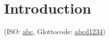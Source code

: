 \documentclass[output=paper]{langscibook}
\begin{document}
\maketitle

\section{Introduction}

(ISO: \href{https://iso639-3.sil.org/code/abc}{abc}, Glottocode: \href{https://glottolog.org/resource/languoid/id/abcd1234}{abcd1234})
 

\ea\label{ex:key:} 
    \gll  \\ 
          \\
    \glt 
\z 

\ea\label{ex:key:}
    \ea\label{ex:key:a}
        \gll  \\ 
              \\
        \glt 
    \ex\label{ex:key:b}
        \gll  \\
              \\
        \glt 
    \z
\z 

\ea\label{ex:key:} 
    \glll \\ 
          \\
          \\
    \glt 
\z 

\ea\label{ex:key:}
    \ea\label{ex:key:a}
        \glll  \\ 
              \\
              \\
        \glt 
    \ex\label{ex:key:b}
        \glll  \\
             \\
              \\
        \glt 
    \z
\z 

\ea\label{ex:key:}
    \ea\label{ex:key:a}
        \gll  \\ 
              \\
        \glt 
    \ex\label{ex:key:b}
        \gll  \\
              \\
        \glt 
    \ex\label{ex:key:c}
        \gll  \\
              \\
        \glt 
    \ex\label{ex:key:d}
        \gll  \\
              \\
        \glt 
    \z
\z 
\end{document}
